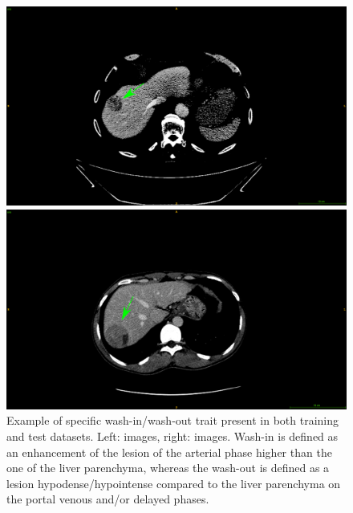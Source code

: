 {\begin{figure}[!ht]
\begin{mdframed}[backgroundcolor=blue!50,linecolor=blue!50]
\begin{minipage}{0.45\linewidth}
		\end{minipage} \\
		\begin{minipage}{0.45\linewidth}
			\includegraphics[width=\linewidth]{images/ImagingTraits/ResizeGDB_washout}
		\end{minipage} \hspace{-0.1cm}
		\begin{minipage}{0.45\linewidth}
			\includegraphics[width=\linewidth]{images/ImagingTraits/ResizeTCIA_washout}
		\end{minipage}
	\end{mdframed}
	\caption{Example of specific wash-in/wash-out trait present in both training and test datasets. Left: \textbf{} images, right: \textbf{} images.
	Wash-in is defined as an enhancement of the lesion of the arterial phase higher than the one of the liver parenchyma, whereas the wash-out is defined as a lesion hypodense/hypointense compared to the liver parenchyma on the portal venous and/or delayed phases.}
	\label{fig:InterDb_imagingTraits3}

\end{figure}}

